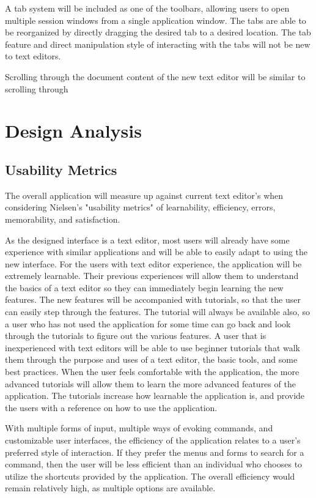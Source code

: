 \documentclass[11pt, oneside]{article}
\begin{document}
A tab system will be included as one of the toolbars, allowing users to open multiple session windows from a single application window. The tabs are able to be reorganized by directly dragging the desired tab to a desired location. The tab feature and direct manipulation style of interacting with the tabs will not be new to text editors. %

Scrolling through the document content of the new text editor will be similar to scrolling through

\section{Design Analysis}
\subsection{Usability Metrics}
The overall application will measure up against current text editor's when considering Nielsen's "usability metrics" of learnability, efficiency, errors, memorability, and satisfaction. 

As the designed interface is a text editor, most users will already have some experience with similar applications and will be able to easily adapt to using the new interface. For the users with text editor experience, the application will be extremely learnable. Their previous experiences will allow them to understand the basics of a text editor so they can immediately begin learning the new features. The new features will be accompanied with tutorials, so that the user can easily step through the features. The tutorial will always be available also, so a user who has not used the application for some time can go back and look through the tutorials to figure out the various features. A user that is inexperienced with text editors will be able to use beginner tutorials that walk them through the purpose and uses of a text editor, the basic tools, and some best practices. When the user feels comfortable with the application, the more advanced tutorials will allow them to learn the more advanced features of the application. The tutorials increase how learnable the application is, and provide the users with a reference on how to use the application.

With multiple forms of input, multiple ways of evoking commands, and customizable user interfaces, the efficiency of the application relates to a user's preferred style of interaction. If they prefer the menus and forms to search for a command, then the user will be less efficient than an individual who chooses to utilize the shortcuts provided by the application. The overall efficiency would remain relatively high, as multiple options are available.
\end{document}
